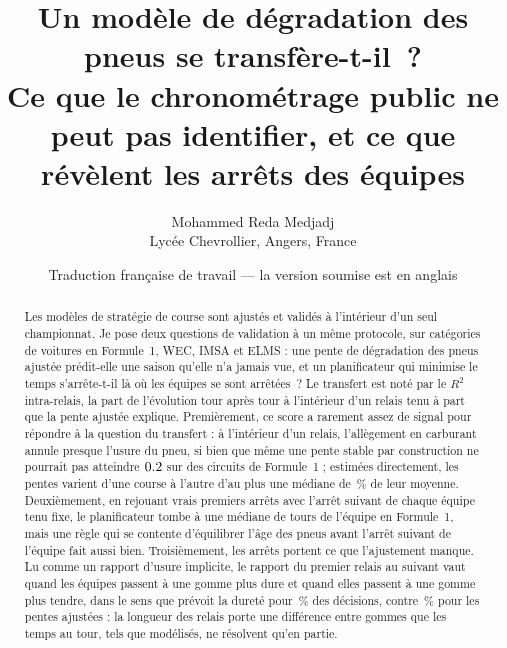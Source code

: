 \documentclass[11pt,a4paper]{article}
\title{Un modèle de dégradation des pneus se transfère-t-il~?\\
\large Ce que le chronométrage public ne peut pas identifier, et ce que
révèlent les arrêts des équipes}
\author{Mohammed Reda Medjadj \\ Lycée Chevrollier, Angers, France}
\date{Traduction française de travail --- la version soumise est en anglais}
\begin{document}
\maketitle

\noindent{}

\begin{abstract}
Les modèles de stratégie de course sont ajustés et validés à l'intérieur d'un
seul championnat. Je pose deux questions de validation à un même protocole, sur
\NClasses{} catégories de voitures en Formule~1, WEC, IMSA et ELMS : une pente de
dégradation des pneus ajustée prédit-elle une saison qu'elle n'a jamais vue, et
un planificateur qui minimise le temps s'arrête-t-il là où les équipes se sont
arrêtées~? Le transfert est noté par le $R^2$ intra-relais, la part de
l'évolution tour après tour à l'intérieur d'un relais tenu à part que la pente
ajustée explique. Premièrement, ce score a rarement assez
de signal pour répondre à la question du transfert : à l'intérieur d'un relais,
l'allègement en carburant annule presque l'usure du pneu, si bien que même une
pente stable par construction ne pourrait pas atteindre $0.2{}$
sur \NCeilingBelowThreshold{} des \NCeilingCircuits{} circuits de Formule~1 ;
estimées directement, les pentes varient d'une course à l'autre d'au plus une médiane de
\TauPubShareReml{}\,\% de leur moyenne. Deuxièmement, en rejouant \NCommitTotal{}
vrais premiers arrêts avec l'arrêt suivant de chaque équipe tenu fixe, le
planificateur tombe à une médiane de \CommitAllAfter{} tours \CommitAllCi{} de l'équipe en
Formule~1, mais une règle qui se contente d'équilibrer l'âge
des pneus avant l'arrêt suivant de l'équipe fait aussi bien. Troisièmement, les arrêts portent ce que l'ajustement manque. Lu
comme un rapport d'usure implicite, le rapport du premier relais au suivant
vaut \ImpliedHarder{} \ImpliedHarderCi{} quand les équipes passent à une gomme
plus dure et \ImpliedSofter{} \ImpliedSofterCi{} quand elles passent à une gomme
plus tendre, dans le sens que prévoit la dureté pour
\ImpliedExpectedSide{}\,\% des décisions, contre \ImpliedFittedExpectedSide{}\,\%
pour les pentes ajustées : la longueur des relais porte une différence entre
gommes que les temps au tour, tels que modélisés, ne résolvent qu'en partie.
\end{abstract}
\end{document}
